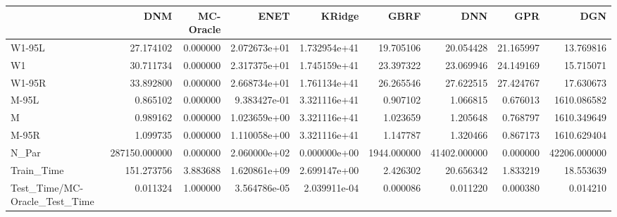 \begin{tabular}{lrrrrrrrr}
\toprule
{} &            DNM &  MC-Oracle &          ENET &        KRidge &         GBRF &           DNN &        GPR &           DGN \\
\midrule
W1-95L                        &      27.174102 &   0.000000 &  2.072673e+01 &  1.732954e+41 &    19.705106 &     20.054428 &  21.165997 &     13.769816 \\
W1                            &      30.711734 &   0.000000 &  2.317375e+01 &  1.745159e+41 &    23.397322 &     23.069946 &  24.149169 &     15.715071 \\
W1-95R                        &      33.892800 &   0.000000 &  2.668734e+01 &  1.761134e+41 &    26.265546 &     27.622515 &  27.424767 &     17.630673 \\
M-95L                         &       0.865102 &   0.000000 &  9.383427e-01 &  3.321116e+41 &     0.907102 &      1.066815 &   0.676013 &   1610.086582 \\
M                             &       0.989162 &   0.000000 &  1.023659e+00 &  3.321116e+41 &     1.023659 &      1.205648 &   0.768797 &   1610.349649 \\
M-95R                         &       1.099735 &   0.000000 &  1.110058e+00 &  3.321116e+41 &     1.147787 &      1.320466 &   0.867173 &   1610.629404 \\
N\_Par                         &  287150.000000 &   0.000000 &  2.060000e+02 &  0.000000e+00 &  1944.000000 &  41402.000000 &   0.000000 &  42206.000000 \\
Train\_Time                    &     151.273756 &   3.883688 &  1.620861e+09 &  2.699147e+00 &     2.426302 &     20.656342 &   1.833219 &     18.553639 \\
Test\_Time/MC-Oracle\_Test\_Time &       0.011324 &   1.000000 &  3.564786e-05 &  2.039911e-04 &     0.000086 &      0.011220 &   0.000380 &      0.014210 \\
\bottomrule
\end{tabular}
